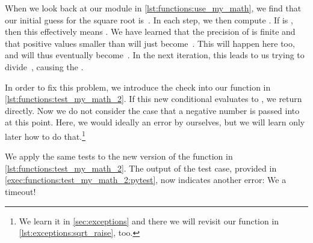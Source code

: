 When we look back at our  module in \cref{lst:functions:use_my_math}, we find that our initial guess for the square root is~.
In each step, we then compute .
If  is , then this effectively means .
We have learned that the precision of  is finite and that positive values smaller than  will just become~.
This will happen here too, and  will thus eventually become~.
In the next iteration, this leads to us trying to divide~, causing the .
%
\FloatBarrier%
%
%
%
%

In order to fix this problem, we introduce the check  into our  function in \cref{lst:functions:test_my_math_2}.
If this new conditional evaluates to , we return~ directly.
Now we do not consider the case that a negative number is passed into  at this point.
Here, we would ideally  an error by ourselves, but we will learn only later how to do that.\footnote{%
We learn it in \cref{sec:exceptions} and there we will revisit our  function in \cref{lst:exceptions:sqrt_raise}, too.}

We apply the same tests to the new version of the  function in \cref{lst:functions:test_my_math_2}.
The output of the test case, provided in \cref{exec:functions:test_my_math_2:pytest}, now indicates another error:
We a timeout!

